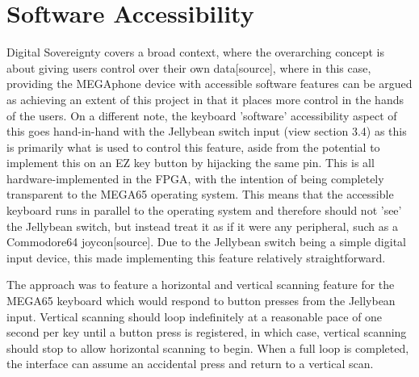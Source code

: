 
\section{Software Accessibility}
Digital Sovereignty covers a broad context, where the overarching concept is about giving users control over their own data[source], where in this case, providing the MEGAphone device with accessible software features can be argued as achieving an extent of this project in that it places more control in the hands of the users.
On a different note, the keyboard 'software' accessibility aspect of this goes hand-in-hand with the Jellybean switch input (view section 3.4) as this is primarily what is used to control this feature, aside from the potential to implement this on an EZ key button by hijacking the same pin.
This is all hardware-implemented in the FPGA, with the intention of being completely transparent to the MEGA65 operating system.
This means that the accessible keyboard runs in parallel to the operating system and therefore should not 'see' the Jellybean switch, but instead treat it as if it were any peripheral, such as a Commodore64 joycon[source].
Due to the Jellybean switch being a simple digital input device, this made implementing this feature relatively straightforward.

The approach was to feature a horizontal and vertical scanning feature for the MEGA65 keyboard which would respond to button presses from the Jellybean input.
Vertical scanning should loop indefinitely at a reasonable pace of one second per key until a button press is registered, in which case, vertical scanning should stop to allow horizontal scanning to begin.
When a full loop is completed, the interface can assume an accidental press and return to a vertical scan. %


